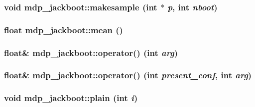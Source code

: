 \label{classmdp__jackboot_aa594e64f4e7155684e2d23f1f7ba2b5d}
\hypertarget{classmdp__jackboot_add5b0171b18a4befe8e526aaf5b30477}{
\subsubsection[{makesample}]{\setlength{\rightskip}{0pt plus 5cm}void mdp\_\-jackboot::makesample (int $\ast$ {\em p}, \/  int {\em nboot})}}
\label{classmdp__jackboot_add5b0171b18a4befe8e526aaf5b30477}
\hypertarget{classmdp__jackboot_ae1d3c643754c88be40ac1957ac4db685}{
\subsubsection[{mean}]{\setlength{\rightskip}{0pt plus 5cm}float mdp\_\-jackboot::mean ()}}
\label{classmdp__jackboot_ae1d3c643754c88be40ac1957ac4db685}
\hypertarget{classmdp__jackboot_a1bfb073e7933a0ff34d8f50743e1d695}{
\subsubsection[{operator()}]{\setlength{\rightskip}{0pt plus 5cm}float\& mdp\_\-jackboot::operator() (int {\em arg})}}
\label{classmdp__jackboot_a1bfb073e7933a0ff34d8f50743e1d695}
\hypertarget{classmdp__jackboot_a7533621a114d565f0c26bcc3ca0df1bb}{
\subsubsection[{operator()}]{\setlength{\rightskip}{0pt plus 5cm}float\& mdp\_\-jackboot::operator() (int {\em present\_\-conf}, \/  int {\em arg})}}
\label{classmdp__jackboot_a7533621a114d565f0c26bcc3ca0df1bb}
\hypertarget{classmdp__jackboot_a56e5206388f943a9fee3d4d2eea3b2ae}{
\subsubsection[{plain}]{\setlength{\rightskip}{0pt plus 5cm}void mdp\_\-jackboot::plain (int {\em i})}}
\label{classmdp__jackboot_a56e5206388f943a9fee3d4d2eea3b2ae}


